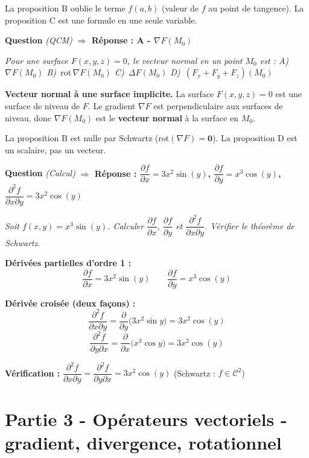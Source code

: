 \documentclass[11pt,a4paper]{article}
\newcounter{qnum}
\newcommand{\qtitre}[2]{%
  \stepcounter{qnum}%
  \medskip\noindent
  \textbf{\color{bleutexte}Question \theqnum}\enspace
  \textit{(#1)}\enspace
  \textcolor{vertok}{\textbf{$\Rightarrow$ Réponse : #2}}
  \par\smallskip
}
\newcommand{\qenonce}[1]{%
  \begin{mdframed}[backgroundcolor=grisbox, linewidth=0pt,
    innerleftmargin=8pt, innerrightmargin=8pt,
    innertopmargin=5pt, innerbottommargin=5pt,
    skipabove=2pt, skipbelow=4pt]
  \small\textit{#1}
  \end{mdframed}
}
\begin{document}
La proposition B oublie le terme $f(a,b)$ (valeur de $f$ au point de tangence). La proposition C est une formule en une seule variable.

\qtitre{QCM}{A - $\nabla F(M_0)$}
\qenonce{Pour une surface $F(x,y,z)=0$, le vecteur normal en un point $M_0$ est :
\quad A)~$\nabla F(M_0)$
\quad B)~$\text{rot}\,\nabla F(M_0)$
\quad C)~$\Delta F(M_0)$
\quad D)~$(F_x + F_y + F_z)(M_0)$}

\begin{methodebox}
\textbf{Vecteur normal à une surface implicite.} La surface $F(x,y,z)=0$ est une surface de niveau de $F$. Le gradient $\nabla F$ est perpendiculaire aux surfaces de niveau, donc $\nabla F(M_0)$ est le \textbf{vecteur normal} à la surface en $M_0$.

La proposition B est nulle par Schwartz ($\text{rot}(\nabla F) = \mathbf{0}$). La proposition D est un scalaire, pas un vecteur.
\end{methodebox}

\qtitre{Calcul}{$\dfrac{\partial f}{\partial x} = 3x^2\sin(y)$,\; $\dfrac{\partial f}{\partial y} = x^3\cos(y)$,\; $\dfrac{\partial^2 f}{\partial x\partial y} = 3x^2\cos(y)$}
\qenonce{Soit $f(x,y) = x^3\sin(y)$. Calculer $\dfrac{\partial f}{\partial x}$, $\dfrac{\partial f}{\partial y}$ et $\dfrac{\partial^2 f}{\partial x\partial y}$. Vérifier le théorème de Schwartz.}

\begin{reponsebox}
\textbf{Dérivées partielles d'ordre 1 :}
$$\frac{\partial f}{\partial x} = 3x^2\sin(y) \qquad \frac{\partial f}{\partial y} = x^3\cos(y)$$

\textbf{Dérivée croisée (deux façons) :}
$$\frac{\partial^2 f}{\partial x\partial y} = \frac{\partial}{\partial y}\bigl(3x^2\sin y\bigr) = \boxed{3x^2\cos(y)}$$
$$\frac{\partial^2 f}{\partial y\partial x} = \frac{\partial}{\partial x}\bigl(x^3\cos y\bigr) = 3x^2\cos(y)$$

\textbf{Vérification :} $\dfrac{\partial^2 f}{\partial x\partial y} = \dfrac{\partial^2 f}{\partial y\partial x} = 3x^2\cos(y)$ \quad\checkmark \quad (Schwartz : $f\in\mathcal{C}^2$)
\end{reponsebox}

\section{Partie 3 - Opérateurs vectoriels - gradient, divergence, rotationnel}
\end{document}
